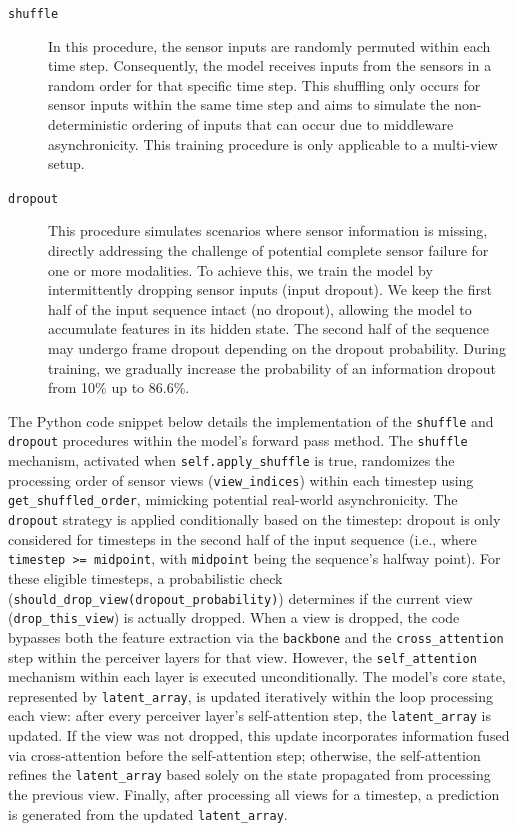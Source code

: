 \begin{description}
    \item[\texttt{shuffle}] In this procedure, the sensor inputs are randomly permuted within each time step. Consequently, the model receives inputs from the sensors in a random order for that specific time step. This shuffling only occurs for sensor inputs within the same time step and aims to simulate the non-deterministic ordering of inputs that can occur due to middleware asynchronicity. This training procedure is only applicable to a multi-view setup.

    \item[\texttt{dropout}] This procedure simulates scenarios where sensor information is missing, directly addressing the challenge of potential complete sensor failure for one or more modalities. To achieve this, we train the model by intermittently dropping sensor inputs (input dropout). We keep the first half of the input sequence intact (no dropout), allowing the model to accumulate features in its hidden state. The second half of the sequence may undergo frame dropout depending on the dropout probability. During training, we gradually increase the probability of an information dropout from 10\% up to 86.6\%.
\end{description}

The Python code snippet below details the implementation of the \texttt{shuffle} and \texttt{dropout} procedures within the model's forward pass method. The \texttt{shuffle} mechanism, activated when \texttt{self.apply\_shuffle} is true, randomizes the processing order of sensor views (\texttt{view\_indices}) within each timestep using \texttt{get\_shuffled\_order}, mimicking potential real-world asynchronicity. The \texttt{dropout} strategy is applied conditionally based on the timestep: dropout is only considered for timesteps in the second half of the input sequence (i.e., where \texttt{timestep >= midpoint}, with \texttt{midpoint} being the sequence's halfway point). For these eligible timesteps, a probabilistic check (\texttt{should\_drop\_view(dropout\_probability)}) determines if the current view (\texttt{drop\_this\_view}) is actually dropped. When a view is dropped, the code bypasses both the feature extraction via the \texttt{backbone} and the \texttt{cross\_attention} step within the perceiver layers for that view. However, the \texttt{self\_attention} mechanism within each layer is executed unconditionally. The model's core state, represented by \texttt{latent\_array}, is updated iteratively within the loop processing each view: after every perceiver layer's self-attention step, the \texttt{latent\_array} is updated. If the view was not dropped, this update incorporates information fused via cross-attention before the self-attention step; otherwise, the self-attention refines the \texttt{latent\_array} based solely on the state propagated from processing the previous view. Finally, after processing all views for a timestep, a prediction is generated from the updated \texttt{latent\_array}.


